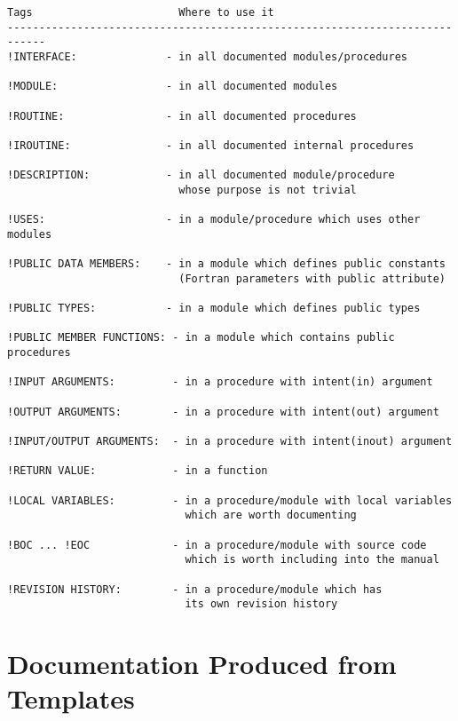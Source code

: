 \documentclass[10pt]{article}
\begin{document}
\begin{verbatim}
Tags                       Where to use it
----------------------------------------------------------------------------
!INTERFACE:              - in all documented modules/procedures

!MODULE:                 - in all documented modules

!ROUTINE:                - in all documented procedures

!IROUTINE:               - in all documented internal procedures

!DESCRIPTION:            - in all documented module/procedure 
                           whose purpose is not trivial

!USES:                   - in a module/procedure which uses other modules

!PUBLIC DATA MEMBERS:    - in a module which defines public constants
                           (Fortran parameters with public attribute)

!PUBLIC TYPES:           - in a module which defines public types

!PUBLIC MEMBER FUNCTIONS: - in a module which contains public procedures

!INPUT ARGUMENTS:         - in a procedure with intent(in) argument

!OUTPUT ARGUMENTS:        - in a procedure with intent(out) argument

!INPUT/OUTPUT ARGUMENTS:  - in a procedure with intent(inout) argument

!RETURN VALUE:            - in a function
 
!LOCAL VARIABLES:         - in a procedure/module with local variables 
                            which are worth documenting

!BOC ... !EOC             - in a procedure/module with source code
                            which is worth including into the manual

!REVISION HISTORY:        - in a procedure/module which has 
                            its own revision history
\end{verbatim}

\newpage

\section{Documentation Produced from Templates}


\end{document}
